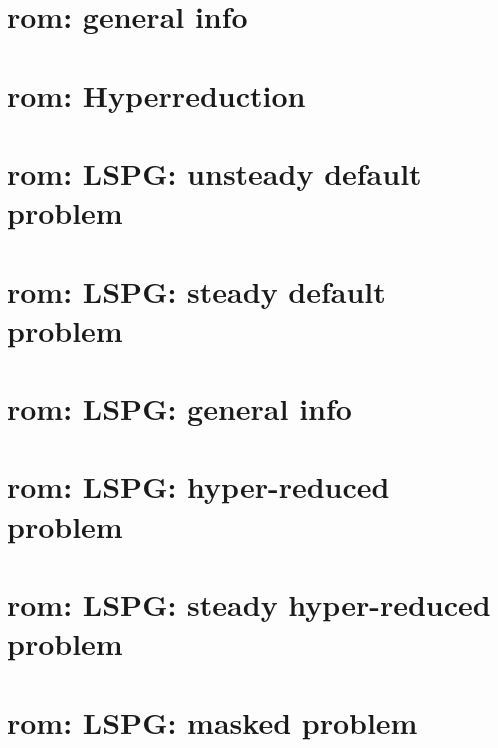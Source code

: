 \let\mypdfximage\pdfximage\def\pdfximage{\immediate\mypdfximage}\documentclass[twoside]{book}
\newcommand{\+}{\discretionary{\mbox{\scriptsize$\hookleftarrow$}}{}{}}
\begin{document}
\chapter{rom\+: general info}
\label{md_pages_components_rom_general}

\chapter{rom\+: Hyperreduction}
\label{md_pages_components_rom_hyperreduction}

\chapter{rom\+: LSPG\+: unsteady default problem}
\label{md_pages_components_rom_lspg_default}

\chapter{rom\+: LSPG\+: steady default problem}
\label{md_pages_components_rom_lspg_default_steady}

\chapter{rom\+: LSPG\+: general info}
\label{md_pages_components_rom_lspg_general}

\chapter{rom\+: LSPG\+: hyper-\/reduced problem}
\label{md_pages_components_rom_lspg_hypred}

\chapter{rom\+: LSPG\+: steady hyper-\/reduced problem}
\label{md_pages_components_rom_lspg_hypred_steady}

\chapter{rom\+: LSPG\+: masked problem}
\label{md_pages_components_rom_lspg_masked}

\end{document}
